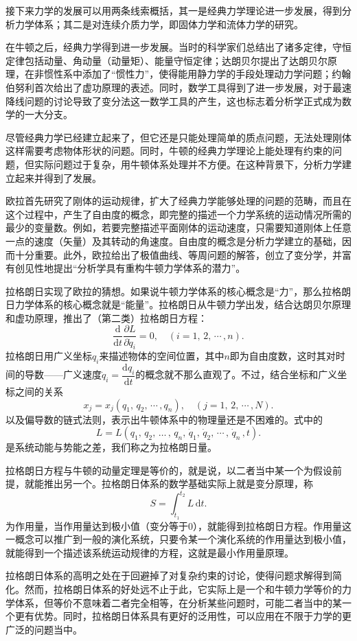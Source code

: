 接下来力学的发展可以用两条线索概括，其一是经典力学理论进一步发展，得到分析力学体系；其二是对连续介质力学，即固体力学和流体力学的研究。

在牛顿之后，经典力学得到进一步发展。当时的科学家们总结出了诸多定律，守恒定律包括动量、角动量（动量矩）、能量守恒定律；达朗贝尔提出了达朗贝尔原理，在非惯性系中添加了“惯性力”，使得能用静力学的手段处理动力学问题；约翰伯努利首次给出了虚功原理的表述。同时，数学工具得到了进一步发展，对于最速降线问题的讨论导致了变分法这一数学工具的产生，这也标志着分析学正式成为数学的一大分支。

尽管经典力学已经建立起来了，但它还是只能处理简单的质点问题，无法处理刚体这样需要考虑物体形状的问题。同时，牛顿的经典力学理论上能处理有约束的问题，但实际问题过于复杂，用牛顿体系处理并不方便。在这种背景下，分析力学建立起来并得到了发展。

欧拉首先研究了刚体的运动规律，扩大了经典力学能够处理的问题的范畴，而且在这个过程中，产生了自由度的概念，即完整的描述一个力学系统的运动情况所需的最少的变量数。例如，若要完整描述平面刚体的运动速度，只需要知道刚体上任意一点的速度（矢量）及其转动的角速度。自由度的概念是分析力学建立的基础，因而十分重要。此外，欧拉给出了极值曲线、等周问题的解答，创立了变分学，并富有创见性地提出“分析学具有重构牛顿力学体系的潜力”。

拉格朗日实现了欧拉的猜想。如果说牛顿力学体系的核心概念是“力”，那么拉格朗日力学体系的核心概念就是“能量”。拉格朗日从牛顿力学出发，结合达朗贝尔原理和虚功原理，推出了（第二类）拉格朗日方程：
\[
	\frac{\mathrm{d}}{\mathrm{d}t}\frac{\partial L}{\partial \dot{q}_i}=0, \quad (i=1,\,2,\,\cdots\,,n).
\]
拉格朗日用广义坐标$q_i$来描述物体的空间位置，其中$n$即为自由度数，这时其对时间的导数——广义速度$\dot{q}_i=\dfrac{\mathrm{d} q_i}{\mathrm{d} t}$的概念就不那么直观了。不过，结合坐标和广义坐标之间的关系
\[
	x_j=x_j\left(q_1,\,q_2,\, \cdots\,, q_n\right), \quad \left(j=1,\, 2,\, \cdots\,, N\right).
\]
以及偏导数的链式法则，表示出牛顿体系中的物理量还是不困难的。式中的 \[
	L=L(q_1,\,q_2,\,\dots\,,\,q_n,\,\dot{q}_1,\,\dot{q}_2,\,\cdots\,,\,\dot{q}_n\,,t)
	.\]是系统动能与势能之差，我们称之为拉格朗日量。

拉格朗日方程与牛顿的动量定理是等价的，就是说，以二者当中某一个为假设前提，就能推出另一个。拉格朗日体系的数学基础实际上就是变分原理，称
\[
	S=\int_{t_1}^{t_2}{L\,\mathrm{d}t}.
\]
为作用量，当作用量达到极小值（变分等于$0$），就能得到拉格朗日方程。作用量这一概念可以推广到一般的演化系统，只要令某一个演化系统的作用量达到极小值，就能得到一个描述该系统运动规律的方程，这就是最小作用量原理。

拉格朗日体系的高明之处在于回避掉了对复杂约束的讨论，使得问题求解得到简化。然而，拉格朗日体系的好处远不止于此，它实际上是一个和牛顿力学等价的力学体系，但等价不意味着二者完全相等，在分析某些问题时，可能二者当中的某一个更有优势。同时，拉格朗日体系具有更好的泛用性，可以应用在不限于力学的更广泛的问题当中。


